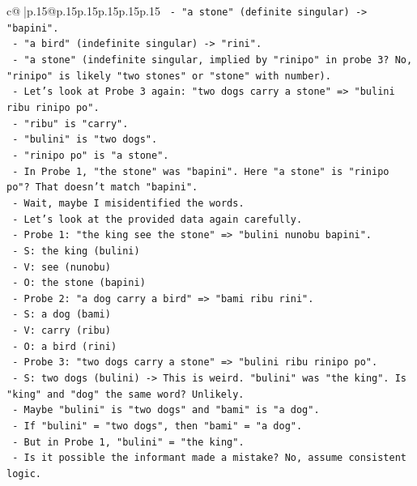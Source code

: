 \documentclass{article}
\begin{document}
{\begin{supertabular}{c@{$\;$}|p{.15\linewidth}@{}p{.15\linewidth}p{.15\linewidth}p{.15\linewidth}p{.15\linewidth}p{.15\linewidth}}
{{{\texttt{   {-} "a stone" (definite singular) {-}> "bapini".} \\
\texttt{   {-} "a bird" (indefinite singular) {-}> "rini".} \\
\texttt{   {-} "a stone" (indefinite singular, implied by "rinipo" in probe 3? No, "rinipo" is likely "two stones" or "stone" with number).} \\
\texttt{   {-} Let's look at Probe 3 again: "two dogs carry a stone" => "bulini ribu rinipo po".} \\
\texttt{     {-} "ribu" is "carry".} \\
\texttt{     {-} "bulini" is "two dogs".} \\
\texttt{     {-} "rinipo po" is "a stone".} \\
\texttt{   {-} In Probe 1, "the stone" was "bapini". Here "a stone" is "rinipo po"? That doesn't match "bapini".} \\
\texttt{   {-} Wait, maybe I misidentified the words.} \\
\texttt{   {-} Let's look at the provided data again carefully.} \\
\texttt{   {-} Probe 1: "the king see the stone" => "bulini nunobu bapini".} \\
\texttt{     {-} S: the king (bulini)} \\
\texttt{     {-} V: see (nunobu)} \\
\texttt{     {-} O: the stone (bapini)} \\
\texttt{   {-} Probe 2: "a dog carry a bird" => "bami ribu rini".} \\
\texttt{     {-} S: a dog (bami)} \\
\texttt{     {-} V: carry (ribu)} \\
\texttt{     {-} O: a bird (rini)} \\
\texttt{   {-} Probe 3: "two dogs carry a stone" => "bulini ribu rinipo po".} \\
\texttt{     {-} S: two dogs (bulini) {-}> This is weird. "bulini" was "the king". Is "king" and "dog" the same word? Unlikely.} \\
\texttt{     {-} Maybe "bulini" is "two dogs" and "bami" is "a dog".} \\
\texttt{     {-} If "bulini" = "two dogs", then "bami" = "a dog".} \\
\texttt{     {-} But in Probe 1, "bulini" = "the king".} \\
\texttt{     {-} Is it possible the informant made a mistake? No, assume consistent logic.} \\
}}}
\end{supertabular}}
\end{document}
